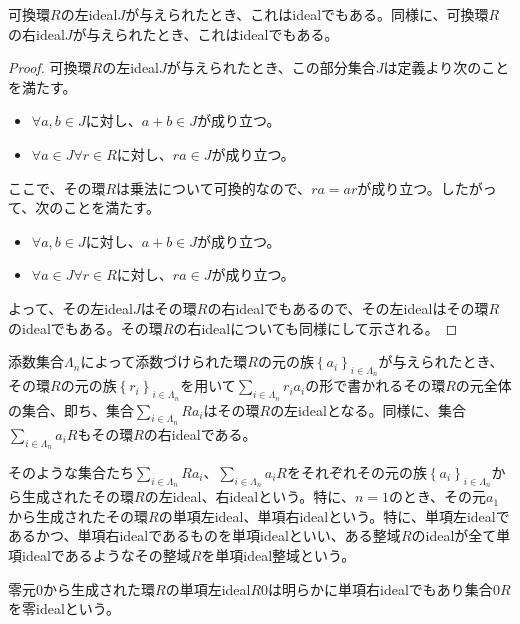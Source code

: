 \documentclass[dvipdfmx]{jsarticle}
\begin{document}
\begin{thm}\label{3.3.2.2}
可換環$R$の左ideal$J$が与えられたとき、これはidealでもある。同様に、可換環$R$の右ideal$J$が与えられたとき、これはidealでもある。
\end{thm}
\begin{proof}
可換環$R$の左ideal$J$が与えられたとき、この部分集合$J$は定義より次のことを満たす。
\begin{itemize}
\item
  $\forall a,b \in J$に対し、$a + b \in J$が成り立つ。
\item
  $\forall a \in J\forall r \in R$に対し、$ra \in J$が成り立つ。
\end{itemize}
ここで、その環$R$は乗法について可換的なので、$ra = ar$が成り立つ。したがって、次のことを満たす。
\begin{itemize}
\item
  $\forall a,b \in J$に対し、$a + b \in J$が成り立つ。
\item
  $\forall a \in J\forall r \in R$に対し、$ra \in J$が成り立つ。
\end{itemize}
よって、その左ideal$J$はその環$R$の右idealでもあるので、その左idealはその環$R$のidealでもある。その環$R$の右idealについても同様にして示される。
\end{proof}
\begin{thm}\label{3.3.2.3}
添数集合$\varLambda_{n}$によって添数づけられた環$R$の元の族$\left\{ a_{i} \right\}_{i \in \varLambda_{n}}$が与えられたとき、その環$R$の元の族$\left\{ r_{i} \right\}_{i \in \varLambda_{n}}$を用いて$\sum_{i \in \varLambda_{n}} {r_{i}a_{i}}$の形で書かれるその環$R$の元全体の集合、即ち、集合$\sum_{i \in \varLambda_{n}} {Ra_{i}}$はその環$R$の左idealとなる。同様に、集合$\sum_{i \in \varLambda_{n}} {a_{i}R}$もその環$R$の右idealである。
\end{thm}
\begin{dfn}
そのような集合たち$\sum_{i \in \varLambda_{n}} {Ra_{i}}$、$\sum_{i \in \varLambda_{n}} {a_{i}R}$をそれぞれその元の族$\left\{ a_{i} \right\}_{i \in \varLambda_{n}}$から生成されたその環$R$の左ideal、右idealという。特に、$n = 1$のとき、その元$a_{1}$から生成されたその環$R$の単項左ideal、単項右idealという。特に、単項左idealであるかつ、単項右idealであるものを単項idealといい、ある整域$R$のidealが全て単項idealであるようなその整域$R$を単項ideal整域という。
\end{dfn}
\begin{dfn}
零元$0$から生成された環$R$の単項左ideal$R0$は明らかに単項右idealでもあり集合$0R$を零idealという。
\end{dfn}
\end{document}
